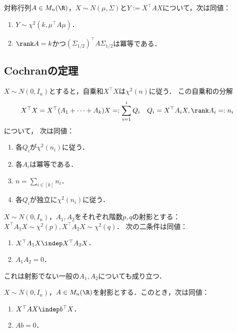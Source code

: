 \documentclass[uplatex, dvipdfmx]{jsreport}
\begin{document}
\begin{proposition}
    対称行列$A\in M_n(\R)$，$X\sim N(\mu,\Sigma)$と$Y:=X^\top AX$について，次は同値：
    \begin{enumerate}
        \item $Y\sim\chi^2(k,\mu^\top A\mu)$．
        \item $\rank A=k$かつ$(\Sigma_{1/2})^\top A\Sigma_{1/2}$は冪等である．
    \end{enumerate}
\end{proposition}

\subsection{Cochranの定理}

\begin{theorem}[Cochran]
    $X\sim N(0,I_n)$とすると，自乗和$X^\top X$は$\chi^2(n)$に従う．
    この自乗和の分解\[X^\top X=X^\top(A_1+\cdots+A_k)X=:\sum_{i=1}^iQ_i\quad Q_i=X^\top A_iX,\rank A_i=:n_i\]について，
    次は同値：
    \begin{enumerate}
        \item 各$Q_i$が$\chi^2(n_i)$に従う．
        \item 各$A_i$は冪等である．
        \item $n=\sum_{i\in[k]}n_i$．
        \item 各$Q_i$が独立に$\chi^2(n_i)$に従う．
    \end{enumerate}
\end{theorem}

\begin{proposition}
    $X\sim N(0,I_n)$，$A_1,A_2$をそれぞれ階数$p,q$の射影とする：$X^\top A_1X\sim\chi^2(p),X^\top A_2X\sim\chi^2(q)$．
    次の二条件は同値：
    \begin{enumerate}
        \item $X^\top A_1X\indep X^\top A_2X$．
        \item $A_1A_2=0$．
    \end{enumerate}
    これは射影でない一般の$A_1,A_2$についても成り立つ．
\end{proposition}

\begin{proposition}
    $X\sim N(0,I_n)$，$A\in M_n(\R)$を射影とする．このとき，次は同値：
    \begin{enumerate}
        \item $X^\top AX\indep b^\top X$．
        \item $Ab=0$．
    \end{enumerate}
\end{proposition}
\end{document}
